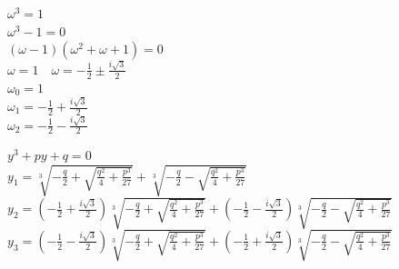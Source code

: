 \documentclass[A4]{ctexart}
\begin{document}
	$\omega^3=1$\\
	$\omega^3-1=0$\\
	$(\omega-1)(\omega^2+\omega+1)=0$\\
	$\omega=1\quad\omega=-\frac 12\pm\frac{i\sqrt{3}}2$\\
	$\omega_0=1$\\
	$\omega_1=-\frac 12+\frac{i\sqrt{3}}2$\\
	$\omega_2=-\frac 12-\frac{i\sqrt{3}}2$
	\begin{tcolorbox}[colback=white,colframe=yellow]
		$y^3+py+q=0$\\
		$y_1=\sqrt[3]{-\frac{q}{2}+\sqrt{\frac{q^2}{4}+\frac{p^3}{27}}}+\sqrt[3]{-\frac{q}{2}-\sqrt{\frac{q^2}{4}+\frac{p^3}{27}}}$\\
		$y_2=\left(-\frac 12+\frac{i\sqrt{3}}2\right)\sqrt[3]{-\frac{q}{2}+\sqrt{\frac{q^2}{4}+\frac{p^3}{27}}}+\left(-\frac 12-\frac{i\sqrt{3}}2\right)\sqrt[3]{-\frac{q}{2}-\sqrt{\frac{q^2}{4}+\frac{p^3}{27}}}$\\
		$y_3=\left(-\frac 12-\frac{i\sqrt{3}}2\right)\sqrt[3]{-\frac{q}{2}+\sqrt{\frac{q^2}{4}+\frac{p^3}{27}}}+\left(-\frac 12+\frac{i\sqrt{3}}2\right)\sqrt[3]{-\frac{q}{2}-\sqrt{\frac{q^2}{4}+\frac{p^3}{27}}}$
	\end{tcolorbox}
\end{document}

